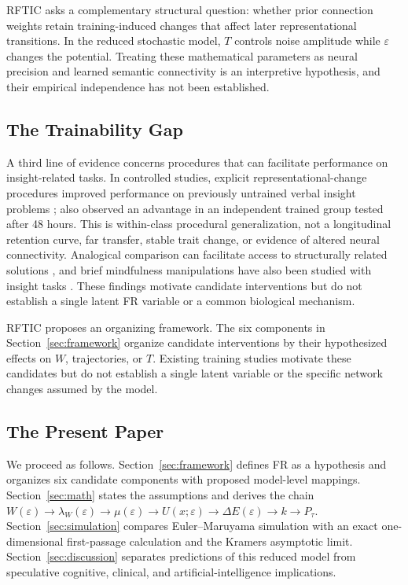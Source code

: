\documentclass[a4paper,twocolumn,10pt]{article}
\newcommand{\eps}{\varepsilon}
\newcommand{\dE}{\Delta E}
\begin{document}
RFTIC asks a complementary structural question: whether prior connection weights retain
training-induced changes that affect later representational transitions. In the reduced stochastic
model, $T$ controls noise amplitude while $\eps$ changes the potential. Treating these mathematical
parameters as neural precision and learned semantic connectivity is an interpretive hypothesis, and their
empirical independence has not been established.

\subsection{The Trainability Gap}

A third line of evidence concerns procedures that can facilitate performance on insight-related
tasks. In controlled studies, explicit representational-change procedures improved performance on
previously untrained verbal insight problems \citep{patrick2014training,patrick2015representation};
\citet{patrick2015representation} also observed an advantage in an independent trained group tested
after 48 hours. This is within-class procedural generalization, not a longitudinal retention curve,
far transfer, stable trait change, or evidence of altered neural connectivity. Analogical comparison
can facilitate access to structurally related solutions \citep{gick1983analogy,kurtz2007analogy},
and brief mindfulness manipulations have also been studied with insight tasks
\citep{ostafin2012mindfulness}. These findings motivate candidate interventions but do not establish
a single latent FR variable or a common biological mechanism.

RFTIC proposes an organizing framework. The six components in Section~\ref{sec:framework} organize
candidate interventions by their hypothesized effects on $W$, trajectories, or $T$. Existing
training studies motivate these candidates but do not establish a single latent variable or the
specific network changes assumed by the model.

\subsection{The Present Paper}

We proceed as follows. Section~\ref{sec:framework} defines FR as a hypothesis and organizes six
candidate components with proposed model-level mappings.
Section~\ref{sec:math} states the assumptions and derives the chain
$W(\eps)\to\lambda_W(\eps)\to\mu(\eps)\to U(x;\eps)\to\dE(\eps)\to k\to P_\tau$.
Section~\ref{sec:simulation} compares Euler--Maruyama simulation with an exact one-dimensional
first-passage calculation and the Kramers asymptotic limit. Section~\ref{sec:discussion} separates
predictions of this reduced model from speculative cognitive, clinical, and artificial-intelligence
implications.
\end{document}
